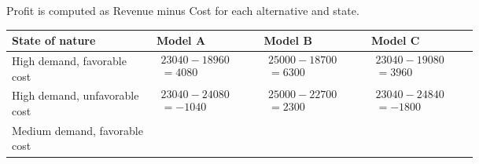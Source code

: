 \begin{ExamProblems}
\begin{center}
		\end{center}
		Profit is computed as Revenue minus Cost for each alternative and state.
		\begin{center}
			\begin{tabular}{l p{0.23\linewidth} p{0.23\linewidth} p{0.23\linewidth}}
				\toprule
				State of nature & Model A & Model B & Model C \\
				\midrule
				High demand, favorable cost &
				$\begin{array}{l}
					23040 - 18960\\
					= 4080
				\end{array}$ &
				$\begin{array}{l}
					25000 - 18700\\
					= 6300
				\end{array}$ &
				$\begin{array}{l}
					23040 - 19080\\
					= 3960
				\end{array}$ \\
				High demand, unfavorable cost &
				$\begin{array}{l}
					23040 - 24080\\
					= -1040
				\end{array}$ &
				$\begin{array}{l}
					25000 - 22700\\
					= 2300
				\end{array}$ &
				$\begin{array}{l}
					23040 - 24840\\
					= -1800
				\end{array}$ \\
				Medium demand, favorable cost &

\end{tabular}
\end{center}
\end{ExamProblems}
